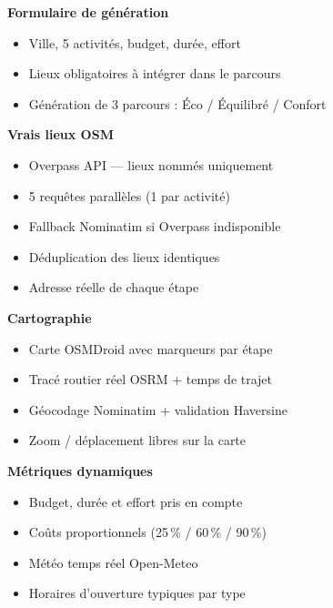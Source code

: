 \documentclass[a4paper,12pt,openany]{report}
\begin{document}
\begin{tcolorbox}[enhanced, colback=lightbg, colframe=navy, arc=4pt,
  boxrule=0.6pt, left=8pt, right=8pt, top=6pt, bottom=6pt,
  title={\textbf{TravelPath — Générateur d'itinéraires}},
  fonttitle=\bfseries\small\color{white},
  colbacktitle=navy]

\begin{multicols}{2}
\small
\textbf{Formulaire de génération}
\begin{itemize}[leftmargin=*,itemsep=0pt,topsep=2pt]
  \item Ville, 5 activités, budget, durée, effort
  \item Lieux obligatoires à intégrer dans le parcours
  \item Génération de 3 parcours : Éco / Équilibré / Confort
\end{itemize}

\textbf{Vrais lieux OSM}
\begin{itemize}[leftmargin=*,itemsep=0pt,topsep=2pt]
  \item Overpass API — lieux nommés uniquement
  \item 5 requêtes parallèles (1 par activité)
  \item Fallback Nominatim si Overpass indisponible
  \item Déduplication des lieux identiques
  \item Adresse réelle de chaque étape
\end{itemize}

\textbf{Cartographie}
\begin{itemize}[leftmargin=*,itemsep=0pt,topsep=2pt]
  \item Carte OSMDroid avec marqueurs par étape
  \item Tracé routier réel OSRM + temps de trajet
  \item Géocodage Nominatim + validation Haversine
  \item Zoom / déplacement libres sur la carte
\end{itemize}

\columnbreak

\textbf{Métriques dynamiques}
\begin{itemize}[leftmargin=*,itemsep=0pt,topsep=2pt]
  \item Budget, durée et effort pris en compte
  \item Coûts proportionnels (25\,\% / 60\,\% / 90\,\%)
  \item Météo temps réel Open-Meteo
  \item Horaires d'ouverture typiques par type
\end{itemize}


\end{multicols}
\end{tcolorbox}
\end{document}
